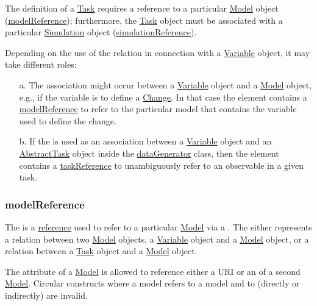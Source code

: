 The definition of a \hyperref[class:task]{Task} requires a reference to a particular \hyperref[class:model]{Model} object (\hyperref[sec:modelReference]{modelReference}); furthermore, the \hyperref[class:abstractTask]{Task} object must be associated with a particular \hyperref[class:simulation]{Simulation} object (\hyperref[sec:simulationReference]{simulationReference}).

Depending on the use of the  relation in connection with a \hyperref[class:variable]{Variable} object, it may take different roles: 

\begin{enumerate}
\item[a.]{The  association might occur between a \hyperref[class:variable]{Variable} object and a \hyperref[class:model]{Model} object, e.g., if the variable is to define a \hyperref[class:change]{Change}. 
In that case the  element contains a \hyperref[sec:modelReference]{modelReference} to refer to the particular model that contains the variable used to define the change.}

\item[b.]{If the  is used as an association between a \hyperref[class:variable]{Variable} object and an \hyperref[class:abstractTask]{AbstractTask} object inside the \hyperref[class:dataGenerator]{dataGenerator} class, then the  element contains a \hyperref[sec:taskReference]{taskReference} to unambiguously refer to an observable in a given task.}
\end{enumerate}


\subsubsection{modelReference}
\label{sec:modelReference}
The  is a \hyperref[sec:reference]{reference} used to refer to a particular \hyperref[class:model]{Model} via a \hyperref[type:sidref]{}. The  either represents a relation between two \hyperref[class:model]{Model} objects, a \hyperref[class:variable]{Variable} object and a \hyperref[class:model]{Model} object, or a relation between a \hyperref[class:task]{Task} object and a \hyperref[class:model]{Model} object.

The \hyperref[sec:model_source]{} attribute of a \hyperref[class:model]{Model} is allowed to reference either a URI or an \hyperref[type:sid]{} of a second \hyperref[class:model]{Model}. Circular constructs where a model  refers to a model  and  to  (directly or indirectly) are invalid.

